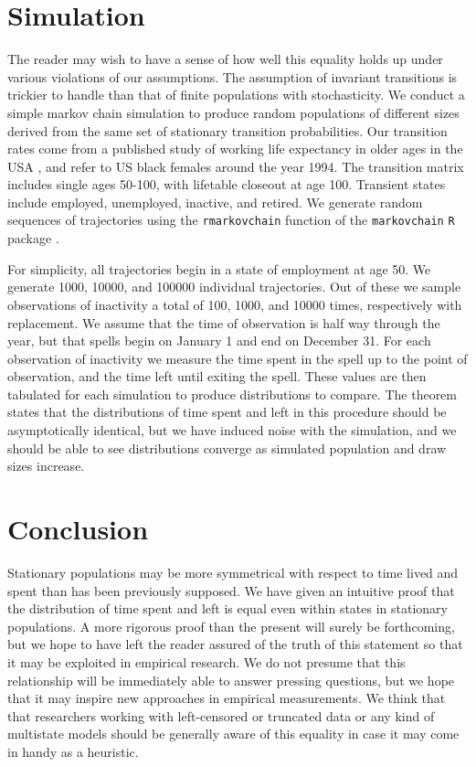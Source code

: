 \documentclass[12pt,oneside,a4paper]{article}
\theoremstyle{definition}
\begin{document}
\section{Simulation}
The reader may wish to have a sense of how well this equality holds up under
various violations of our assumptions. The assumption of invariant transitions
is trickier to handle than that of finite populations with stochasticity. We
conduct a simple markov chain simulation to
produce random populations of different sizes derived from the same
set of stationary transition probabilities. Our transition rates come
from a published study of working life expectancy in older ages in the USA
\citep{Dudel2017}, and refer to US black females around the year 1994. The transition matrix includes
single ages 50-100, with lifetable closeout at age 100. Transient states include
employed, unemployed, inactive, and retired. We generate random sequences of
trajectories using the \texttt{rmarkovchain} function of the
\texttt{markovchain} \texttt{R} package \citep{spedicato2017}.

For simplicity, all trajectories begin in a state of employment at age 50. We
generate 1000, 10000, and 100000 individual trajectories. Out of these we
sample observations of inactivity a total of 100, 1000, and 10000 times,
respectively with replacement. We assume that the time of
observation is half way through the year, but that spells begin on January 1 and
end on December 31. For each observation of inactivity we measure the time spent
in the spell up to the point of observation, and the time left until exiting the
spell. These values are then tabulated for each simulation to produce
distributions to compare. The theorem states that the distributions of time
spent and left in this procedure should be asymptotically identical, but we have
induced noise with the simulation, and we should be able to see distributions
converge as simulated population and draw sizes increase.




\section{Conclusion}
Stationary populations may be more symmetrical with respect to time lived and
spent than has been previously supposed. We have given an intuitive proof that
the distribution of time spent and left is equal even within states in
stationary populations. A more rigorous proof than the present will
surely be forthcoming, but we hope to have left the reader assured of
the truth of this statement so that it may be exploited in
empirical research. We do not presume that this relationship will be immediately able to answer pressing questions, but we
hope that it may inspire new approaches in empirical measurements. We think
that that researchers working with left-censored or truncated data or
any kind of multistate models should be generally aware of this equality in case
it may come in handy as a heuristic.
\end{document}

